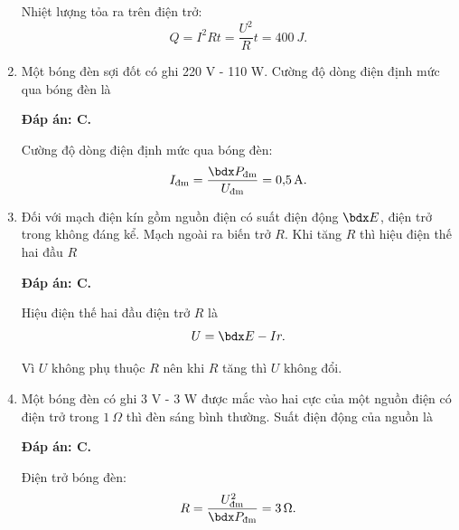 \begin{enumerate}[label=\bfseries Câu \arabic*:]
{		Nhiệt lượng tỏa ra trên điện trở:
		$$Q=I^2 Rt = \dfrac{U^2}{R}t = \SI{400}{J}.$$
	}
	\item {}
	
	\cauhoi
	{Một bóng đèn sợi đốt có ghi 220 V - 110 W. Cường độ dòng điện định mức qua bóng đèn là
		
	}
	\loigiai
	{	\textbf{Đáp án: C.}
		
		Cường độ dòng điện định mức qua bóng đèn:
		$$I_\text{đm} = \dfrac{\calP_\text{đm}}{U_\text{đm}} = \SI{0.5}{A}.$$
	}
	\item {}
	
	\cauhoi
	{Đối với mạch điện kín gồm nguồn điện có suất điện động $\calE$, điện trở trong không đáng kể. Mạch ngoài ra biến trở $R$. Khi tăng $R$ thì hiệu điện thế hai đầu $R$
		
	}
	\loigiai
	{	\textbf{Đáp án: C.}
		
		Hiệu điện thế hai đầu điện trở $R$ là
		$$U=\calE - Ir.$$
		
		Vì $U$ không phụ thuộc $R$ nên khi $R$ tăng thì $U$ không đổi.
	}
	\item {}
	
	\cauhoi
	{Một bóng đèn có ghi 3 V - 3 W được mắc vào hai cực của một nguồn điện có điện trở trong $\SI{1}{\Omega}$ thì đèn sáng bình thường. Suất điện động của nguồn là
		
	}
	\loigiai
	{	\textbf{Đáp án: C.}
		
		Điện trở bóng đèn:
		$$R=\dfrac{U_\text{đm}^2}{\calP_\text{đm}} = \SI{3}{\Omega}.$$
		
}
\end{enumerate}
